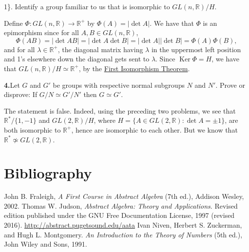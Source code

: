 \documentclass[10pt,]{book}
\theoremstyle{plain}
\theoremstyle{definition}
\theoremstyle{definition}
\theoremstyle{definition}
\theoremstyle{definition}
\numberwithin{equation}{section}
\def\R{\mathbb{R}}
\DeclareMathOperator{\Ker}{Ker}
\begin{document}
1\}\). Identify a group familiar to us that is isomorphic to \(GL(n,\R)/H\).%
\par\smallskip
Define \(\Phi:GL(n,\R)\to \R^+\) by \(\Phi(A)=|\det A|\). We have that \(\Phi\) is an epimorphism since for all \(A,B\in GL(n,\R)\),%
\begin{equation*}
\Phi(AB)=|\det AB|=|\det A \det B|=|\det
A||\det B|=\Phi(A)\Phi(B),
\end{equation*}
and for all \(\lambda \in \R^+\), the diagonal matrix having \(\lambda\) in the uppermost left position and 1's elsewhere down the diagonal gets sent to \(\lambda\). Since \(\Ker
\Phi=H\), we have that \(GL(n,\R)/H \simeq \R^+\), by the \hyperref[fit]{First Isomorphism Theorem}.%
\par\smallskip
\noindent\textbf{4.}\quad{}Let \(G\) and \(G'\) be groups with respective normal subgroups \(N\) and \(N'\). Prove or disprove: If \(G/N\simeq G'/N'\) then \(G\simeq
G'\).%
\par\smallskip
The statement is false. Indeed, using the preceding two problems, we see that \(\R^*/\{1,-1\}\) and \(GL(2,\R)/H\), where \(H=\{A\in GL(2,\R):\det A =\pm 1\}\), are both isomorphic to \(\R^+\), hence are isomorphic to each other. But we know that \(\R^* \not\simeq GL(2,\R)\).%
\par\smallskip
\typeout{************************************************}
\typeout{************************************************}
\chapter[{Bibliography}]{Bibliography}\label{references-1}
\begin{referencelist}
\hypertarget{F}{}John B. Fraleigh, \textit{A First Course in Abstract Algebra} (7th ed.), Addison Wesley, 2002.
\hypertarget{J}{}Thomas W. Judson, \textit{Abstract Algebra: Theory and Applications}. Revised edition published under the GNU Free Documentation License, 1997 (revised 2016). \href{http://abstract.pugetsound.edu/aata}{http://abstract.pugetsound.edu/aata}
\hypertarget{NZM}{}Ivan Niven, Herbert S. Zuckerman, and Hugh L. Montgomery. \textit{An Introduction to the Theory of Numbers} (5th ed.), John Wiley and Sons, 1991.
\end{referencelist}
\typeout{************************************************}
\typeout{************************************************}
\end{document}
